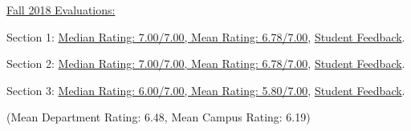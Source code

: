 \documentclass[letterpaper,11pt]{article}
\begin{document}
{\begin{description}
				\item \underline{Fall 2018 Evaluations:}
				\item Section 1: \href{https://nrjenkins.github.io/files/docs/teaching_evals/POSC010_Fall18_Section22_Scores.pdf}{Median Rating: 7.00/7.00, Mean Rating: 6.78/7.00}, \href{https://nrjenkins.github.io/files/docs/teaching_evals/POSC010_Fall18_Section22_Comments.pdf}{Student Feedback}.
				\item Section 2: \href{https://nrjenkins.github.io/files/docs/teaching_evals/POSC010_Fall18_Section25_Scores.pdf}{Median Rating: 7.00/7.00, Mean Rating: 6.78/7.00}, \href{https://nrjenkins.github.io/files/docs/teaching_evals/POSC010_Fall18_Section25_Comments.pdf}{Student Feedback}.
				\item Section 3: \href{https://nrjenkins.github.io/files/docs/teaching_evals/POSC010_Fall18_Section31_Scores.pdf}{Median Rating: 6.00/7.00, Mean Rating: 5.80/7.00}, \href{https://nrjenkins.github.io/files/docs/teaching_evals/POSC010_Fall18_Section31_Comments.pdf}{Student Feedback}.
				\item (Mean Department Rating: 6.48, Mean Campus Rating: 6.19)
			\end{description}}
\end{document}
